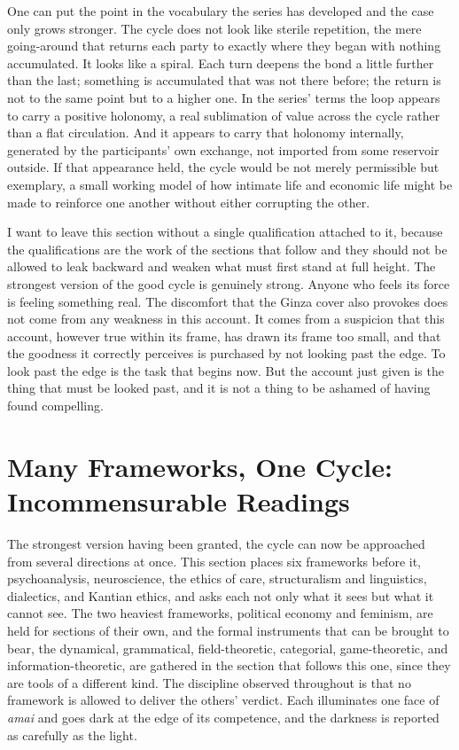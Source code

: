One can put the point in the vocabulary the series has developed and the case only grows stronger. The cycle does not look like sterile repetition, the mere going-around that returns each party to exactly where they began with nothing accumulated. It looks like a spiral. Each turn deepens the bond a little further than the last; something is accumulated that was not there before; the return is not to the same point but to a higher one. In the series' terms the loop appears to carry a positive holonomy, a real sublimation of value across the cycle rather than a flat circulation. And it appears to carry that holonomy internally, generated by the participants' own exchange, not imported from some reservoir outside. If that appearance held, the cycle would be not merely permissible but exemplary, a small working model of how intimate life and economic life might be made to reinforce one another without either corrupting the other.

I want to leave this section without a single qualification attached to it, because the qualifications are the work of the sections that follow and they should not be allowed to leak backward and weaken what must first stand at full height. The strongest version of the good cycle is genuinely strong. Anyone who feels its force is feeling something real. The discomfort that the Ginza cover also provokes does not come from any weakness in this account. It comes from a suspicion that this account, however true within its frame, has drawn its frame too small, and that the goodness it correctly perceives is purchased by not looking past the edge. To look past the edge is the task that begins now. But the account just given is the thing that must be looked past, and it is not a thing to be ashamed of having found compelling.

\section{Many Frameworks, One Cycle: Incommensurable Readings}

The strongest version having been granted, the cycle can now be approached from several directions at once. This section places six frameworks before it, psychoanalysis, neuroscience, the ethics of care, structuralism and linguistics, dialectics, and Kantian ethics, and asks each not only what it sees but what it cannot see. The two heaviest frameworks, political economy and feminism, are held for sections of their own, and the formal instruments that can be brought to bear, the dynamical, grammatical, field-theoretic, categorial, game-theoretic, and information-theoretic, are gathered in the section that follows this one, since they are tools of a different kind. The discipline observed throughout is that no framework is allowed to deliver the others' verdict. Each illuminates one face of \textit{amai} and goes dark at the edge of its competence, and the darkness is reported as carefully as the light.

